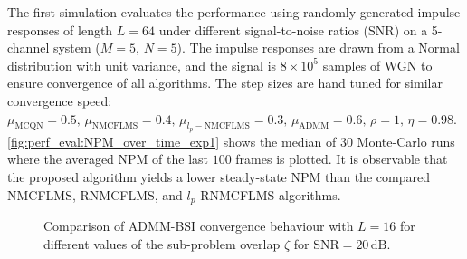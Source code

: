 \documentclass{article}
\begin{document}
The first simulation evaluates the performance using randomly generated impulse responses of length \(L=64\) under different signal-to-noise ratios (SNR) on a 5-channel system (\(M=5,\, N=5\)).
The impulse responses are drawn from a Normal distribution with unit variance, and the signal is \(8 \times 10^{5}\) samples of WGN to ensure convergence of all algorithms.
The step sizes are hand tuned for similar convergence speed: \(\mu_{\text{MCQN}}=0.5,\, \mu_{\text{NMCFLMS}}=0.4,\, \mu_{l_p-\text{NMCFLMS}}=0.3,\, \mu_{\text{ADMM}}=0.6,\, \rho=1,\,\eta=0.98 \).
\autoref{fig:perf_eval:NPM_over_time_exp1} shows the median of 30 Monte-Carlo runs where the averaged NPM of the last \(100\) frames is plotted.
It is observable that the proposed algorithm yields a lower steady-state NPM than the compared NMCFLMS, RNMCFLMS, and \(l_p\)-RNMCFLMS algorithms.

\begin{figure}[t]
    \centering
    \hspace*{-0.2cm}
    \hspace*{-0.0cm}
    \vspace*{-0.2cm}
    \caption{Comparison of ADMM-BSI convergence behaviour with \(L\!=\!16\) for different values of the sub-problem overlap \(\zeta\) for \(\text{SNR}=20\,\text{dB}\).}
    \label{fig:perf_eval:NPM_over_time_exp2}
\end{figure}
\end{document}
